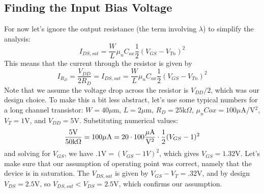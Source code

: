 \subsection{Finding the Input Bias Voltage}
For now let's ignore the output resistance (the term involving $\lambda$) to simplify the analysis:
    \begin{equation}
        {I_{DS,sat}} = \frac{W}{L}{\mu _n}{C_{ox}}\frac{1}{2}{({V_{GS}} - {V_{Tn}})^2}
    \end{equation}
This means that the current through the resistor is given by
    \begin{equation}
        {I_{{R_D}}} = \frac{{{V_{DD}}}}{{2{R_D}}} = {I_{DS,sat}} = \frac{W}{L}{\mu _n}{C_{ox}}\frac{1}{2}{({V_{GS}} - {V_{Tn}})^2}
    \end{equation}
Note that we assume the voltage drop across the resistor is $V_{DD}/2$, which was our design choice.  To make this a bit less abstract, let's use some typical numbers for a long channel transistor: $W=40\mu$m, $L = 2\mu$m,  $R_D = 25$k$\Omega$, $\mu_nCox = 100\mu$A/V$^2$, $V_T = 1$V, and $V_{DD} = 5$V.  Substituting numerical values:
    \begin{equation}
        \frac{{5{\rm{V}}}}{{50{\rm{k}}\Omega }} = 100{\rm{\mu A}} = 20 \cdot 100\frac{{{\rm{\mu A}}}}{{{{\rm{V}}^2}}} \cdot \frac{1}{2}{({V_{GS}} - 1)^2}
    \end{equation}
and solving for $V_{GS}$, we have $.1\mathrm{V} = {({V_{GS}} - 1V)^2}$, which gives ${V_{GS}} = 1.32$V.  %
Let's make sure that our assumption of operating point was correct, namely that the device is in saturation.  The $V_{DS,sat}$ is given by ${V_{GS}} - {V_T} = .32$V, and by design $V_{DS} = 2.5$V, so $V_{DS,sat} < {V_{DS}} = 2.5$V, which confirms our assumption.
